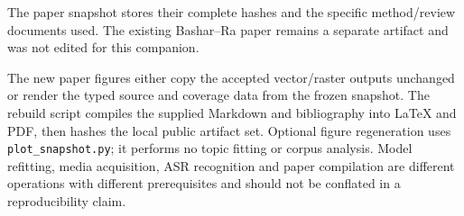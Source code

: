\documentclass[
  11pt,
]{article}
\begin{document}
The paper snapshot stores their complete hashes and the specific
method/review documents used. The existing Bashar--Ra paper remains a
separate artifact and was not edited for this companion.

The new paper figures either copy the accepted vector/raster outputs
unchanged or render the typed source and coverage data from the frozen
snapshot. The rebuild script compiles the supplied Markdown and
bibliography into LaTeX and PDF, then hashes the local public artifact
set. Optional figure regeneration uses \texttt{plot\_snapshot.py}; it
performs no topic fitting or corpus analysis. Model refitting, media
acquisition, ASR recognition and paper compilation are different
operations with different prerequisites and should not be conflated in a
reproducibility claim.
\end{document}
